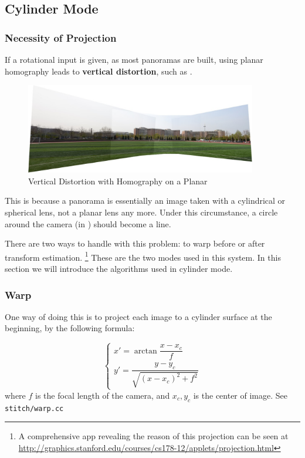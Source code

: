 
\subsection{Cylinder Mode}
\subsubsection{Necessity of Projection}
If a rotational input is given, as most panoramas are built,
using planar homography leads to \textbf{vertical distortion}, such as .
\begin{figure}[H]
  \centering
  \includegraphics[width=0.9\textwidth]{res/distort.png}
  \caption{Vertical Distortion with Homography on a Planar\label{fig:distort}}
\end{figure}

This is because a panorama is essentially an image taken with
a cylindrical or spherical lens, not a planar lens any more.
Under this circumstance, a circle around the camera (in ) should
become a line.

There are two ways to handle with this problem: to warp before or after
transform estimation.
\footnote{A comprehensive app revealing the reason of this projection can be seen at \url{http://graphics.stanford.edu/courses/cs178-12/applets/projection.html}}
These are the two modes used in this system. In this section we will
introduce the algorithms used in cylinder mode.

\subsubsection{Warp}
One way of doing this is to project each image
to a cylinder surface at the beginning, by the following formula:

\[  \begin{cases}
    x' = \arctan{\dfrac{x-x_c}{f}}\\
    y' = \dfrac{y-y_c}{\sqrt{(x-x_c)^2 + f^2}}
  \end{cases}\]
where $ f$ is the focal length of the camera, and $ x_c, y_c$ is the center of image.
See \verb|stitch/warp.cc|

